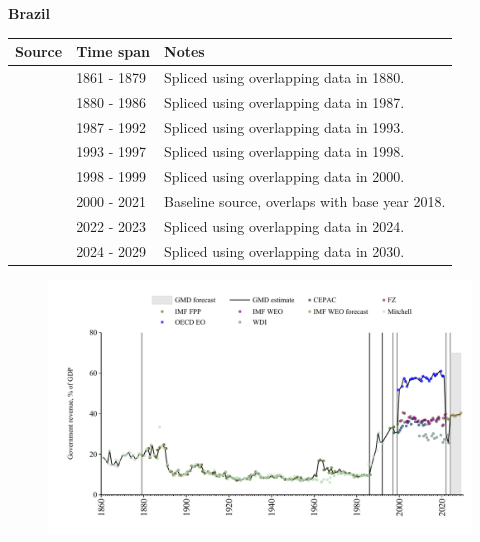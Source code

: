 \documentclass[12pt,a4paper,landscape]{article}
\begin{document}
\begin{adjustbox}{max totalsize={\paperwidth}{\paperheight},center}
\begin{minipage}[t][\textheight][t]{\textwidth}
\vspace*{0.5cm}
{}
\begin{center}
{\Large\bfseries Brazil}
\end{center}
\vspace{0.5cm}
\begin{table}[H]
\centering
\small
\begin{tabular}{|l|l|l|}
\hline
\textbf{Source} & \textbf{Time span} & \textbf{Notes} \\
\hline
\rowcolor{white}\cite{Mitchell}& 1861 - 1879 &Spliced using overlapping data in 1880.\\
\rowcolor{lightgray}\cite{IMF_FPP}& 1880 - 1986 &Spliced using overlapping data in 1987.\\
\rowcolor{white}\cite{Mitchell}& 1987 - 1992 &Spliced using overlapping data in 1993.\\
\rowcolor{lightgray}\cite{IMF_FPP}& 1993 - 1997 &Spliced using overlapping data in 1998.\\
\rowcolor{white}\cite{CEPAC}& 1998 - 1999 &Spliced using overlapping data in 2000.\\
\rowcolor{lightgray}\cite{OECD_EO}& 2000 - 2021 &Baseline source, overlaps with base year 2018.\\
\rowcolor{white}\cite{WDI}& 2022 - 2023 &Spliced using overlapping data in 2024.\\
\rowcolor{lightgray}\cite{IMF_WEO_forecast}& 2024 - 2029 &Spliced using overlapping data in 2030.\\
\hline
\end{tabular}
\end{table}
\begin{figure}[H]
\centering
\includegraphics[width=\textwidth,height=0.6\textheight,keepaspectratio]{graphs/BRA_govrev_GDP.pdf}
\end{figure}
\end{minipage}
\end{adjustbox}
\end{document}
